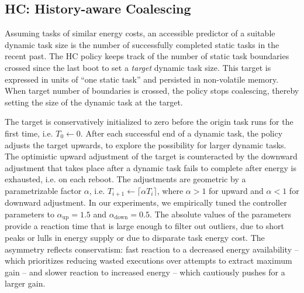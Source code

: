 
\subsection{HC: History-aware Coalescing}

Assuming tasks of similar energy costs, an accessible predictor of a
suitable dynamic task size is the number of successfully completed static tasks
in the recent past.
%
The HC policy keeps track of the number of static task boundaries crossed since
the last boot to set a \emph{target} dynamic task size.
%
This target is expressed in units of ``one static task'' and persisted in
non-volatile memory.
%
When target number of boundaries is crossed, the policy stops coalescing,
thereby setting the size of the dynamic task at the target.

The target is conservatively initialized to zero before the origin task runs
for the first time, i.e. $T_0 \gets 0$.
%
After each successful end of a dynamic task, the policy adjusts the target
upwards, to explore the possibility for larger dynamic tasks.
%
The optimistic upward adjustment of the target is counteracted by the downward
adjustment that takes place after a dynamic task fails to complete after energy
is exhausted, i.e. on each reboot.
%
The adjustments are geometric by a parametrizable factor $\alpha$, i.e.
$T_{i+1} \gets \lceil \alpha T_i \rceil$, where $\alpha  >
1$ for upward and $\alpha < 1$ for downward adjustment.
%
In our experiments, we empirically tuned the controller parameters to $\alpha_\text{up} =
1.5$ and $\alpha_\text{down} = 0.5$.
%
The absolute values of the parameters provide a reaction time that is large
enough to filter out outliers, due to short peaks or lulls in energy supply or
due to disparate task energy cost.
%
The asymmetry reflects conservatism: fast reaction to a decreased energy
availability -- which prioritizes reducing wasted executions over attempts to
extract maximum gain -- and slower reaction to increased energy -- which
cautiously pushes for a larger gain.

